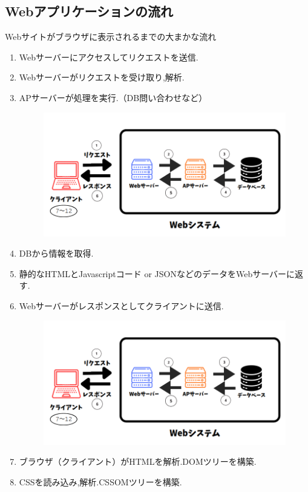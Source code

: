 \documentclass[aspectratio=169]{beamer}
\begin{document}
\subsection{Webアプリケーションの流れ}
\begin{frame}[allowframebreaks]{Webサイトがブラウザに表示されるまでの大まかな流れ}
    \begin{enumerate}
        \setlength{\parskip}{1em}
        \item Webサーバーにアクセスしてリクエストを送信.
        \item Webサーバーがリクエストを受け取り,解析.
        \item APサーバーが処理を実行.（DB問い合わせなど）
        \begin{figure}
            \includegraphics[scale=0.21]{webfloat.png}
        \end{figure}
        \item DBから情報を取得.
        
        \item 静的なHTMLとJavascriptコード or JSONなどのデータをWebサーバーに返す.
        \item Webサーバーがレスポンスとしてクライアントに送信.
        \begin{figure}
            \includegraphics[scale=0.19]{webfloat.png}
        \end{figure}
        \item ブラウザ（クライアント）がHTMLを解析.DOMツリーを構築.
        \item CSSを読み込み,解析.CSSOMツリーを構築.
        

\end{enumerate}
\end{frame}
\end{document}

